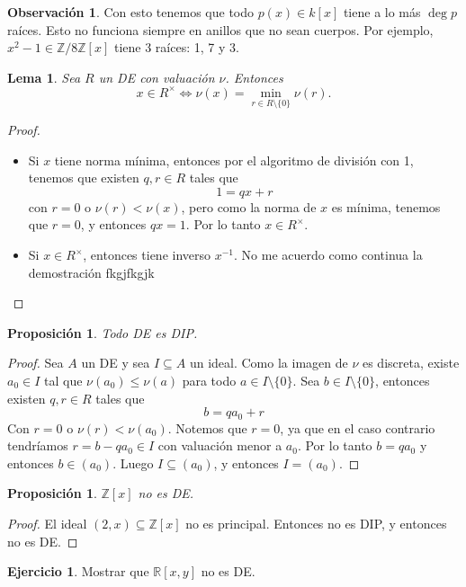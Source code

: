 \documentclass{article}
\newtheorem{proposition}[theorem]{Proposición}
\newtheorem{lemma}[theorem]{Lema}
\theoremstyle{definition}
\newtheorem{exercise}{Ejercicio}
\newtheorem*{obs}{Observación}
\theoremstyle{remark}
\numberwithin{equation}{section}
\newcommand{\R}{\mathbb{R}}
\newcommand{\Z}{\mathbb{Z}}
\newcommand{\zmz}[1]{\Z/ #1 \Z}
\begin{document}
\begin{obs}
  Con esto tenemos que todo $p(x) \in k[x]$ tiene a lo más $\deg{p}$ raíces. Esto no funciona siempre en anillos que no sean cuerpos. Por ejemplo, $x^2 - 1 \in \zmz8[x]$ tiene 3 raíces: 1, 7 y 3.
\end{obs}

\begin{lemma}
  Sea $R$ un DE con valuación $\nu$. Entonces 
  \[ x \in R^\times \iff \nu(x) = \min_{r \in R \setminus \{0\}} \nu(r). \]
\end{lemma}
\begin{proof}
  \ \begin{itemize}
    \item \boxed{\impliedby} Si $x$ tiene norma mínima, entonces por el algoritmo de división con 1, tenemos que existen $q,r \in R$ tales que 
    \[ 1 = qx+r \]
    con $r = 0$ o $\nu(r) < \nu(x)$, pero como la norma de $x$ es mínima, tenemos que $r = 0$, y entonces $qx = 1$. Por lo tanto $x \in R^\times$.
    \item \boxed{\implies} Si $x \in R^\times$, entonces tiene inverso $x^{-1}$. No me acuerdo como continua la demostración fkgjfkgjk %
  \end{itemize}
\end{proof}

\begin{proposition}
  Todo DE es DIP.
\end{proposition}
\begin{proof}
  Sea $A$ un DE y sea $I \subseteq A$ un ideal. Como la imagen de $\nu$ es discreta, existe $a_0 \in I$ tal que $\nu(a_0) \leq \nu(a)$ para todo $a \in I \setminus \{0\}$. Sea $b \in I \setminus \{0\}$, entonces existen $q,r \in R$ tales que 
  \[ b = qa_0 + r \]
  Con $r = 0$ o $\nu(r) < \nu(a_0)$. Notemos que $r = 0$, ya que en el caso contrario tendríamos $r = b - qa_0 \in I$ con valuación menor a $a_0$. Por lo tanto $b = qa_0$ y entonces $b \in (a_0)$. Luego $I \subseteq (a_0)$, y entonces $I = (a_0)$.
\end{proof}

\begin{proposition}
  $\Z[x]$ no es DE.
\end{proposition}
\begin{proof}
  El ideal $(2,x) \subseteq \Z[x]$ no es principal. Entonces no es DIP, y entonces no es DE.
\end{proof}

\begin{exercise}
  Mostrar que $\R[x,y]$ no es DE.
\end{exercise}
\end{document}
